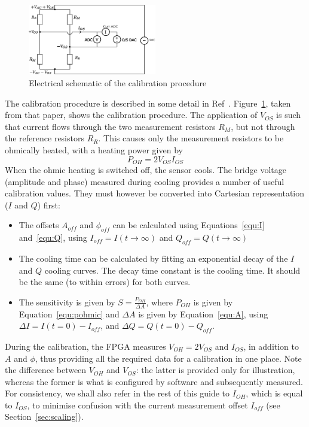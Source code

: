 \documentclass[12pt,a4paper]{article}
\begin{document}
\begin{figure}
  \centering
  \includegraphics[width=0.5\textwidth]{calibration.eps}
  \caption{Electrical schematic of the calibration procedure\label{fig:calibration}}
\end{figure}

The calibration procedure is described in some detail in Ref~\cite{lovell-2015}. Figure~\ref{fig:calibration}, taken from that paper, shows the calibration
procedure. The application of $V_{OS}$ is such that current flows through the two measurement resistors $R_M$, but not through the reference resistors
$R_R$. This causes only the measurement resistors to be ohmically heated, with a heating power given by
\begin{equation}
  \label{equ:pohmic}
  P_{OH} = 2 V_{OS} I_{OS}
\end{equation}
When the ohmic heating is switched off, the sensor cools. The bridge voltage (amplitude and phase) measured during cooling provides a number of useful
calibration values. They must however be converted into Cartesian representation ($I$ and $Q$) first:
\begin{itemize}
\item{The offsets $A_{off}$ and $\phi_{off}$ can be calculated using Equations~\ref{equ:I} and~\ref{equ:Q}, using $I_{off} = I(t\rightarrow\infty)$ and $Q_{off}
    = Q(t\rightarrow\infty)$}
\item{The cooling time can be calculated by fitting an exponential decay of the $I$ and $Q$ cooling curves. The decay time constant is the cooling time.
    It should be the same (to within errors) for both curves.}
\item{The sensitivity is given by $S = \frac{P_{OH}}{\Delta A}$, where $P_{OH}$ is given by Equation~\ref{equ:pohmic} and $\Delta A$ is given by
    Equation~\ref{equ:A}, using $\Delta I = I(t=0) - I_{off}$, and $\Delta Q = Q(t=0) - Q_{off}$.}
\end{itemize}
During the calibration, the FPGA measures $V_{OH} = 2V_{OS}$ and $I_{OS}$, in addition to $A$ and $\phi$, thus providing all the required data for a
calibration in one place. Note the difference between $V_{OH}$ and $V_{OS}$: the latter is provided only for illustration, whereas the former is what
is configured by software and subsequently measured. For consistency, we shall also refer in the rest of this guide to $I_{OH}$, which is equal to
$I_{OS}$, to minimise confusion with the current measurement offset $I_{off}$ (see Section~\ref{sec:scaling}).
\end{document}
